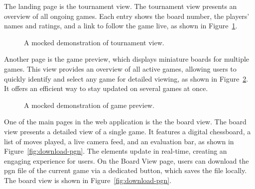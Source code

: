The landing page is the tournament view. The tournament view presents an overview of all ongoing games. Each entry shows the board number, the players' names and ratings, and a link to follow the game live, as shown in Figure~\ref{fig:tournament-view-mocked}. \\

\begin{figure}[h!] \centering {}\caption[Display of tournament view]{A mocked demonstration of tournament view.}\label{fig:tournament-view-mocked} \end{figure}

Another page is the game preview, which displays miniature boards for multiple games. This view provides an overview of all active games, allowing users to quickly identify and select any game for detailed viewing, as shown in Figure~\ref{fig:game-preview}. It offers an efficient way to stay updated on several games at once. \\

\begin{figure}[h!] \centering {}\caption[Display of game preview]{A mocked demonstration of game preview.}\label{fig:game-preview} \end{figure}

One of the main pages in the web application is the the board view. The board view presents a detailed view of a single game. It features a digital chessboard, a list of moves played, a live camera feed, and an evaluation bar, as shown in Figure~\ref{fig:download-pgn}. The elements update in real-time, creating an engaging experience for users. On the Board View page, users can download the \gls{pgn} file of the current game via a dedicated button, which saves the file locally. The board view is shown in Figure~\ref{fig:download-pgn}. \\

